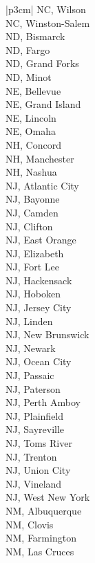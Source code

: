 \begin{customLongTable}{ |p{3cm}| }
NC, Wilson \\ \hline
NC, Winston-Salem \\ \hline
ND, Bismarck \\ \hline
ND, Fargo \\ \hline
ND, Grand Forks \\ \hline
ND, Minot \\ \hline
NE, Bellevue \\ \hline
NE, Grand Island \\ \hline
NE, Lincoln \\ \hline
NE, Omaha \\ \hline
NH, Concord \\ \hline
NH, Manchester \\ \hline
NH, Nashua \\ \hline
NJ, Atlantic City \\ \hline
NJ, Bayonne \\ \hline
NJ, Camden \\ \hline
NJ, Clifton \\ \hline
NJ, East Orange \\ \hline
NJ, Elizabeth \\ \hline
NJ, Fort Lee \\ \hline
NJ, Hackensack \\ \hline
NJ, Hoboken \\ \hline
NJ, Jersey City \\ \hline
NJ, Linden \\ \hline
NJ, New Brunswick \\ \hline
NJ, Newark \\ \hline
NJ, Ocean City \\ \hline
NJ, Passaic \\ \hline
NJ, Paterson \\ \hline
NJ, Perth Amboy \\ \hline
NJ, Plainfield \\ \hline
NJ, Sayreville \\ \hline
NJ, Toms River \\ \hline
NJ, Trenton \\ \hline
NJ, Union City \\ \hline
NJ, Vineland \\ \hline
NJ, West New York \\ \hline
NM, Albuquerque \\ \hline
NM, Clovis \\ \hline
NM, Farmington \\ \hline
NM, Las Cruces \\ \hline

\end{customLongTable}
